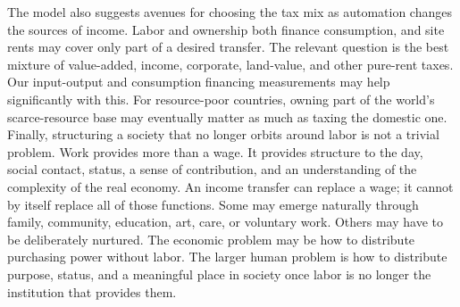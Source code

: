 \documentclass[12pt]{article}
\theoremstyle{plain}
\theoremstyle{definition}
\theoremstyle{remark}
\begin{document}
The model also suggests avenues for choosing the tax mix as automation changes the sources of income. Labor and ownership both finance consumption, and site rents may cover only part of a desired transfer. The relevant question is the best mixture of value-added, income, corporate, land-value, and other pure-rent taxes. Our input-output and consumption financing measurements may help significantly with this. For resource-poor countries, owning part of the world’s scarce-resource base may eventually matter as much as taxing the domestic one.
Finally, structuring a society that no longer orbits around labor is not a trivial problem. Work provides more than a wage. It provides structure to the day, social contact, status, a sense of contribution, and an understanding of the complexity of the real economy. An income transfer can replace a wage; it cannot by itself replace all of those functions. Some may emerge naturally through family, community, education, art, care, or voluntary work. Others may have to be deliberately nurtured. The economic problem may be how to distribute purchasing power without labor. The larger human problem is how to distribute purpose, status, and a meaningful place in society once labor is no longer the institution that provides them.

\end{document}
